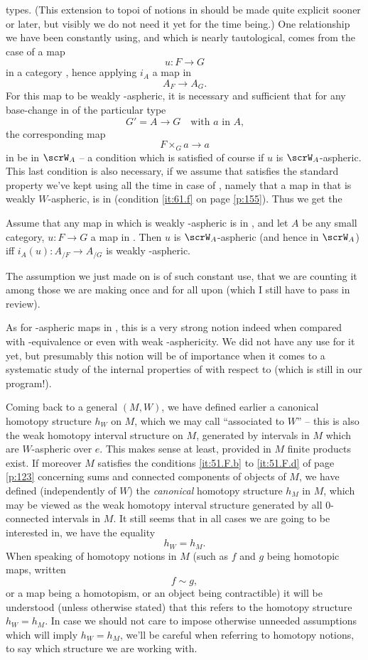 types. (This extension to topoi of notions in \Cat{} should be made
quite explicit sooner or later, but visibly we do not need it yet for
the time being.) One relationship we have been constantly using, and
which is nearly tautological, comes from the case of a map
\[u:F\to G\]
in a category \Ahat, hence applying $i_A$ a map in \Cat
\[A_F \to A_G.\]
For this map to be weakly \scrW-aspheric, it is necessary and
sufficient that for any base-change in \Ahat{} of the particular type
\[ G'=A \to G\quad\text{with $a$ in $A$,}\]
the corresponding map
\[ F\times_G a \to a\]
in \Ahat{} be in $\scrW_A$ -- a condition which is satisfied of course
if $u$ is $\scrW_A$-aspheric. This last condition is also necessary,
if we assume that \scrW{} satisfies the standard property we've kept
using all the time in case of \Cat, namely that a map in \Cat{} that
is weakly $W$-aspheric, is in \scrW{} (condition \ref{it:61.f} on page
\ref{p:155}). Thus we get the
\begin{proposition}
  Assume that any map in \Cat{} which is weakly \scrW-aspheric is in
  \scrW, and let $A$ be any small category, $u:F\to G$ a map in
  \Ahat. Then $u$ is $\scrW_A$-aspheric \textup(and hence in
  $\scrW_A$\textup) if{f} $i_A(u) : A_{/F} \to A_{/G}$ is weakly
  \scrW-aspheric.
\end{proposition}

The assumption we just made on \scrW{} is of such constant use, that
we are counting it among those we are making once and for all upon
\scrW{} (which I still have to pass in review).

As for \scrW-aspheric maps in \Cat, this is a very strong notion
indeed when compared with \scrW-equivalence or even with weak
\scrW-asphericity. We did not have any use for it yet, but presumably
this notion will be of importance when it comes to a systematic study
of the internal properties of \Cat{} with respect to \scrW{} (which is
still in our program!).

Coming back to a general $(M,W)$, we have defined earlier
a canonical homotopy structure $h_W$ on $M$, which we may call
``associated to $W$'' -- this is also the weak homotopy interval
structure on $M$, generated by intervals in $M$ which are $W$-aspheric
over $e$. This makes sense at least, provided in $M$ finite products
exist. If moreover $M$ satisfies the conditions \ref{it:51.F.b} to
\ref{it:51.F.d} of page \ref{p:123} concerning sums and connected
components of objects of $M$, we have defined (independently of $W$)
the \emph{canonical} homotopy structure $h_M$ in $M$, which may be
viewed as the weak homotopy interval structure generated by all
$0$-connected intervals in $M$. It still seems that in all cases we
are going to be interested in, we have the equality
\[h_W = h_M.\]
When speaking of homotopy notions in $M$ (such as $f$ and $g$ being
homotopic maps, written
\[ f\sim g,\]
or a map being a homotopism, or an object being contractible) it will
be understood (unless otherwise stated) that this refers to the
homotopy structure $h_W=h_M$. In case we should not care to impose
otherwise unneeded assumptions which will imply $h_W=h_M$, we'll be
careful when referring to homotopy notions, to say which structure we
are working with.

